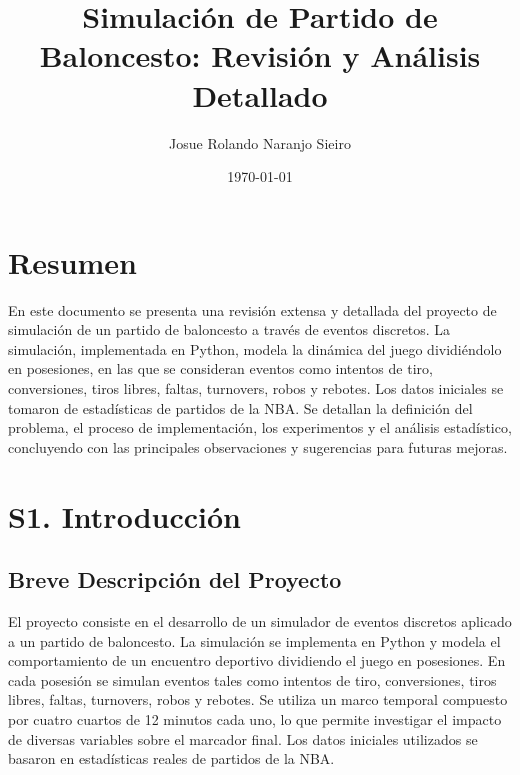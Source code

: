 \documentclass[12pt]{article}
\title{Simulación de Partido de Baloncesto: Revisión y Análisis Detallado}
\author{Josue Rolando Naranjo Sieiro}
\date{\today}
\begin{document}
\maketitle

\onehalfspacing

\section*{Resumen}
En este documento se presenta una revisión extensa y detallada del proyecto de simulación de un partido de baloncesto a través de eventos discretos. La simulación, implementada en Python, modela la dinámica del juego dividiéndolo en posesiones, en las que se consideran eventos como intentos de tiro, conversiones, tiros libres, faltas, turnovers, robos y rebotes. Los datos iniciales se tomaron de estadísticas de partidos de la NBA. Se detallan la definición del problema, el proceso de implementación, los experimentos y el análisis estadístico, concluyendo con las principales observaciones y sugerencias para futuras mejoras.

\newpage

\section{S1. Introducción}

\subsection{Breve Descripción del Proyecto}
El proyecto consiste en el desarrollo de un simulador de eventos discretos aplicado a un partido de baloncesto. La simulación se implementa en Python y modela el comportamiento de un encuentro deportivo dividiendo el juego en posesiones. En cada posesión se simulan eventos tales como intentos de tiro, conversiones, tiros libres, faltas, turnovers, robos y rebotes. Se utiliza un marco temporal compuesto por cuatro cuartos de 12 minutos cada uno, lo que permite investigar el impacto de diversas variables sobre el marcador final. Los datos iniciales utilizados se basaron en estadísticas reales de partidos de la NBA.
\end{document}
